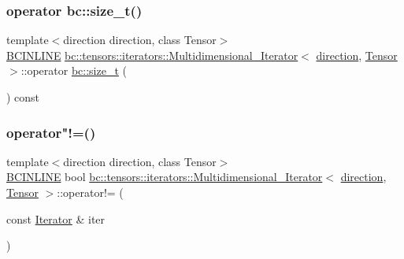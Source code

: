 \subsubsection{\texorpdfstring{operator bc\+::size\+\_\+t()}{operator bc::size\_t()}}
{\footnotesize\ttfamily template$<$direction direction, class Tensor$>$ \\
\hyperlink{common_8h_a6699e8b0449da5c0fafb878e59c1d4b1}{B\+C\+I\+N\+L\+I\+NE} \hyperlink{structbc_1_1tensors_1_1iterators_1_1Multidimensional__Iterator}{bc\+::tensors\+::iterators\+::\+Multidimensional\+\_\+\+Iterator}$<$ \hyperlink{namespacebc_1_1tensors_1_1iterators_ae76efe63fb9cb4985d5e4e6af0ebf296}{direction}, \hyperlink{namespacebc_a659391e47ab612be3ba6c18cf9c89159}{Tensor} $>$\+::operator \hyperlink{namespacebc_aaf8e3fbf99b04b1b57c4f80c6f55d3c5}{bc\+::size\+\_\+t} (\begin{DoxyParamCaption}{ }\end{DoxyParamCaption}) const\hspace{0.3cm}{\ttfamily [inline]}}

\mbox{\label{structbc_1_1tensors_1_1iterators_1_1Multidimensional__Iterator_a34232f9cda8098d53b487b96ad560bdc}} 
\subsubsection{\texorpdfstring{operator"!=()}{operator!=()}}
{\footnotesize\ttfamily template$<$direction direction, class Tensor$>$ \\
\hyperlink{common_8h_a6699e8b0449da5c0fafb878e59c1d4b1}{B\+C\+I\+N\+L\+I\+NE} bool \hyperlink{structbc_1_1tensors_1_1iterators_1_1Multidimensional__Iterator}{bc\+::tensors\+::iterators\+::\+Multidimensional\+\_\+\+Iterator}$<$ \hyperlink{namespacebc_1_1tensors_1_1iterators_ae76efe63fb9cb4985d5e4e6af0ebf296}{direction}, \hyperlink{namespacebc_a659391e47ab612be3ba6c18cf9c89159}{Tensor} $>$\+::operator!= (\begin{DoxyParamCaption}\item[{const \hyperlink{structbc_1_1tensors_1_1iterators_1_1Multidimensional__Iterator_a12d78eb95b3b0fbee7c824f0a79c1513}{Iterator} \&}]{iter }\end{DoxyParamCaption})\hspace{0.3cm}{\ttfamily [inline]}}

